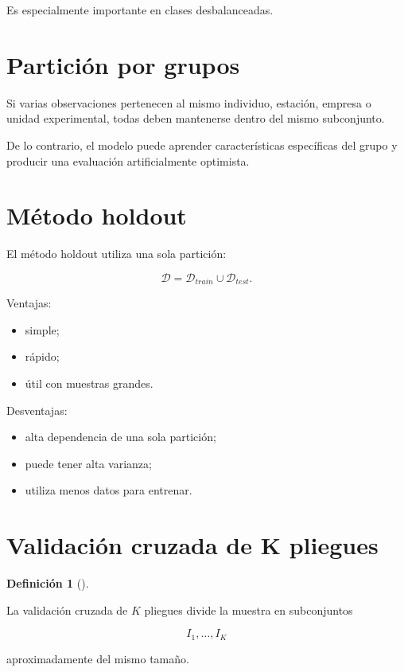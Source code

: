 \documentclass[
  spanish,
  11pt,
  letterpaper,
  DIV=11,
  numbers=noendperiod]{scrreprt}
\providecommand{\tightlist}{%
  \setlength{\itemsep}{0pt}\setlength{\parskip}{0pt}}
\theoremstyle{definition}
\newtheorem{definition}{Definición}[chapter]
\theoremstyle{plain}
\theoremstyle{definition}
\theoremstyle{remark}
\begin{document}
Es especialmente importante en clases desbalanceadas.

\section{Partición por grupos}\label{particiuxf3n-por-grupos}

Si varias observaciones pertenecen al mismo individuo, estación, empresa
o unidad experimental, todas deben mantenerse dentro del mismo
subconjunto.

De lo contrario, el modelo puede aprender características específicas
del grupo y producir una evaluación artificialmente optimista.

\section{Método holdout}\label{muxe9todo-holdout}

El método holdout utiliza una sola partición:

\[
\mathcal{D}
=
\mathcal{D}_{train}
\cup
\mathcal{D}_{test}.
\]

Ventajas:

\begin{itemize}
\tightlist
\item
  simple;
\item
  rápido;
\item
  útil con muestras grandes.
\end{itemize}

Desventajas:

\begin{itemize}
\tightlist
\item
  alta dependencia de una sola partición;
\item
  puede tener alta varianza;
\item
  utiliza menos datos para entrenar.
\end{itemize}

\section{Validación cruzada de K
pliegues}\label{validaciuxf3n-cruzada-de-k-pliegues}

\begin{definition}[]\protect\hypertarget{def-validacion-cruzada}{}\label{def-validacion-cruzada}

La validación cruzada de \(K\) pliegues divide la muestra en
subconjuntos

\[
I_1,\ldots,I_K
\]

aproximadamente del mismo tamaño.

\end{definition}
\end{document}
